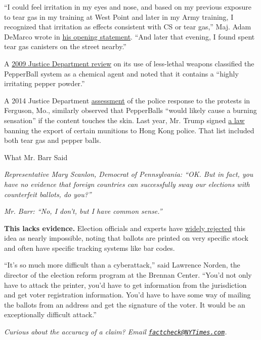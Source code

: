 ``I could feel irritation in my eyes and nose, and based on my previous
exposure to tear gas in my training at West Point and later in my Army
training, I recognized that irritation as effects consistent with CS or
tear gas,'' Maj. Adam DeMarco wrote in
\href{https://naturalresources.house.gov/imo/media/doc/Mr.\%20Adam\%20DeMarco\%20-\%20Written\%20Testimony_.pdf?ftag=MSF0951a18}{his
opening statement}. ``And later that evening, I found spent tear gas
canisters on the street nearby.''

A \href{https://fas.org/irp/agency/doj/oig/lesslethal.pdf\#page=7}{2009
Justice Department review} on its use of less-lethal weapons classified
the PepperBall system as a chemical agent and noted that it contains a
``highly irritating pepper powder.''

A 2014 Justice Department
\href{https://cops.usdoj.gov/RIC/Publications/cops-p317-pub.pdf}{assessment}
of the police response to the protests in Ferguson, Mo., similarly
observed that PepperBalls ``would likely cause a burning sensation'' if
the content touches the skin. Last year, Mr. Trump signed
\href{https://www.congress.gov/116/plaws/publ77/PLAW-116publ77.pdf}{a
law} banning the export of certain munitions to Hong Kong police. That
list included both tear gas and pepper balls.

What Mr. Barr Said

\emph{Representative Mary Scanlon, Democrat of Pennsylvania: ``OK. But
in fact, you have no evidence that foreign countries can successfully
sway our elections with counterfeit ballots, do you?''}

\emph{Mr. Barr: ``No, I don't, but I have common sense.''}

\textbf{This lacks evidence.} Election officials and experts have
\href{https://www.nytimes3xbfgragh.onion/article/mail-in-vote-fraud-ballot.html}{widely
rejected} this idea as nearly impossible, noting that ballots are
printed on very specific stock and often have specific tracking systems
like bar codes.

``It's so much more difficult than a cyberattack,'' said Lawrence
Norden, the director of the election reform program at the Brennan
Center. ``You'd not only have to attack the printer, you'd have to get
information from the jurisdiction and get voter registration
information. You'd have to have some way of mailing the ballots from an
address and get the signature of the voter. It would be an exceptionally
difficult attack.''

\emph{Curious about the accuracy of a claim? Email
\href{mailto:factcheck@NYTimes.com}{\nolinkurl{factcheck@NYTimes.com}}.}

